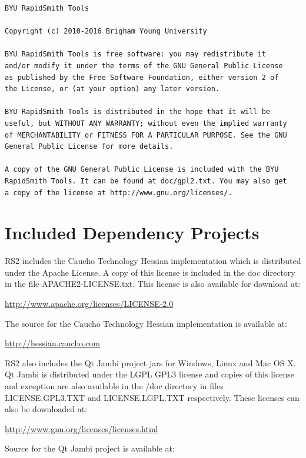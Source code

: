 \documentclass[10pt]{article}
\begin{document}
\begin{verbatim}
BYU RapidSmith Tools

Copyright (c) 2010-2016 Brigham Young University
   
BYU RapidSmith Tools is free software: you may redistribute it
and/or modify it under the terms of the GNU General Public License
as published by the Free Software Foundation, either version 2 of
the License, or (at your option) any later version.
   
BYU RapidSmith Tools is distributed in the hope that it will be
useful, but WITHOUT ANY WARRANTY; without even the implied warranty
of MERCHANTABILITY or FITNESS FOR A PARTICULAR PURPOSE. See the GNU
General Public License for more details.
   
A copy of the GNU General Public License is included with the BYU
RapidSmith Tools. It can be found at doc/gpl2.txt. You may also get
a copy of the license at http://www.gnu.org/licenses/.
\end{verbatim}

\pagebreak
\section{Included Dependency Projects}
RS2 includes the Caucho Technology Hessian implementation which is distributed
under the Apache License. A copy of this license is included in the doc
directory in the file APACHE2-LICENSE.txt. This license is also available for
download at:

\noindent
\hyperref[http://www.apache.org/licenses/LICENSE-2.0]{\color{blue}http://www.apache.org/licenses/LICENSE-2.0}

\bigbreak \noindent
The source for the Caucho Technology Hessian implementation is available at:

\noindent
\hyperref[http://hessian.caucho.com]{\color{blue}http://hessian.caucho.com}

\bigbreak \noindent
RS2 also includes the Qt Jambi project jars for Windows, Linux and Mac OS X.  Qt
Jambi is distributed under the LGPL GPL3 license and copies of this license and
exception are also available in the /doc directory in files LICENSE.GPL3.TXT and
LICENSE.LGPL.TXT respectively. These licenses can also be downloaded at:

\noindent
\hyperref[http://www.gnu.org/licenses/licenses.html]{\color{blue}http://www.gnu.org/licenses/licenses.html}

\bigbreak \noindent
Source for the Qt Jambi project is available at:
\end{document}
